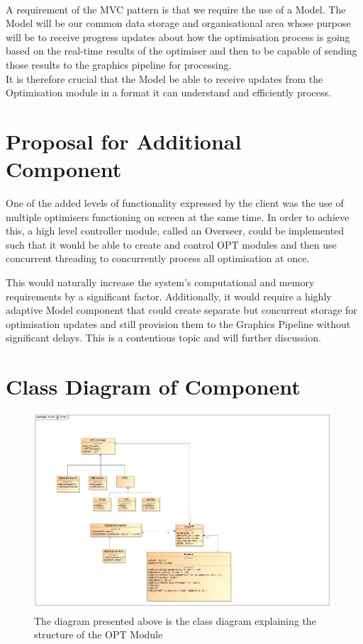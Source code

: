 \documentclass[11pt]{article}
\begin{document}
\paragraph{}
A requirement of the MVC pattern is that we require the use of a Model. The Model will be our common data storage and organisational area whose purpose will be to receive progress updates about how the optimisation process is going based on the real-time results of the optimiser and then to be capable of sending those results to the graphics pipeline for processing. \\ It is therefore crucial that the Model be able to receive updates from the Optimisation module in a format it can understand and efficiently process.

\section{Proposal for Additional Component}
One of the added levels of functionality expressed by the client was the use of multiple optimisers functioning on screen at the same time. In order to achieve this, a high level controller module, called an Overseer, could be implemented such that it would be able to create and control OPT modules and then use concurrent threading to concurrently process all optimisation at once.

This would naturally increase the system's computational and memory requirements by a significant factor. Additionally, it would require a highly adaptive Model component that could create separate but concurrent storage for optimisation updates and still provision them to the Graphics Pipeline without significant delays. This is a contentious topic and will further discussion.

\section{Class Diagram of Component}

\begin{figure}
\includegraphics[scale=0.38]{Model.png}
\caption{The diagram presented above is the class diagram explaining the structure of the OPT Module}
\end{figure}
\end{document}
